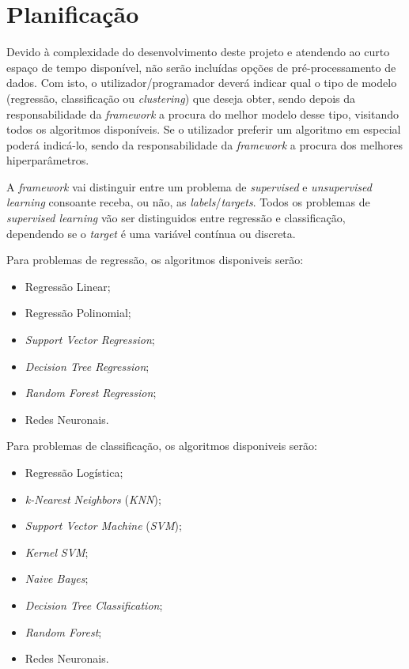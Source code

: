 \documentclass[a4paper]{article}
\begin{document}
\section{Planificação}
\normalsize{
    Devido à complexidade do desenvolvimento deste projeto e atendendo ao curto espaço de tempo disponível, não serão incluídas opções de pré-processamento de dados.
    Com isto, o utilizador/programador deverá indicar qual o tipo de modelo (regressão, classificação ou \textit{clustering}) que deseja obter, 
    sendo depois da responsabilidade da \textit{framework} a procura do melhor modelo desse tipo, visitando todos os algoritmos disponíveis.
    Se o utilizador preferir um algoritmo em especial poderá indicá-lo, sendo da responsabilidade da \textit{framework} a procura dos melhores hiperparâmetros.
    
    A \textit{framework} vai distinguir entre um problema de \textit{supervised} e \textit{unsupervised learning} consoante receba, ou não, as \textit{labels}/\textit{targets}.
    Todos os problemas de \textit{supervised learning} vão ser distinguidos entre regressão e classificação, dependendo se o \textit{target} é uma variável contínua ou discreta.
    
    Para problemas de regressão, os algoritmos disponiveis serão: 
    \begin{itemize}
        \item Regressão Linear;
        \item Regressão Polinomial;
        \item \textit{Support Vector Regression};
        \item \textit{Decision Tree Regression};
        \item \textit{Random Forest Regression};
        \item Redes Neuronais.
    \end{itemize}
    
    Para problemas de classificação, os algoritmos disponiveis serão:
    \begin{itemize}
        \item Regressão Logística;
        \item \textit{k-Nearest Neighbors} (\textsl{KNN});
        \item \textit{Support Vector Machine} (\textsl{SVM});
        \item \textit{Kernel} \textsl{SVM};
        \item \textit{Naive Bayes};
        \item \textit{Decision Tree Classification};
        \item \textit{Random Forest};
        \item Redes Neuronais.
    \end{itemize}
    
}
\end{document}

